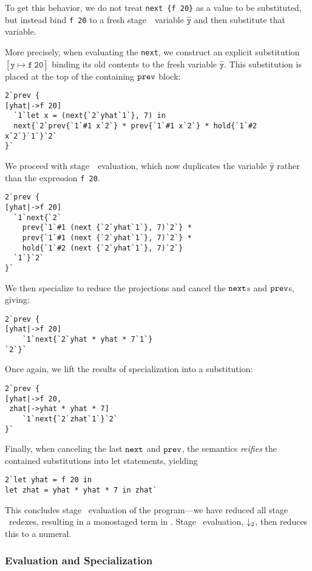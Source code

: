 To get this behavior, we do not treat \verb|next {f 20}| as a value to be substituted, 
but instead bind \verb|f 20| to a fresh stage~\bbtwo\ variable $\mathtt{\hat y}$
and then substitute that variable.

More precisely, when evaluating the \verb|next|, we construct an explicit
substitution $\mathtt{[\hat y\mapsto f~20]}$ binding its old contents to the
fresh variable $\mathtt{\hat y}$. This substitution is placed at the top of the
containing ${\tt prev}$ block:
\begin{lstlisting} 
2`prev {
[yhat|->f 20]
  `1`let x = (next{`2`yhat`1`}, 7) in
  next{`2`prev{`1`#1 x`2`} * prev{`1`#1 x`2`} * hold{`1`#2 x`2`}`1`}`2`
}`
\end{lstlisting}
We proceed with stage~\bbone\ evaluation, which now duplicates the variable
$\mathtt{\hat y}$ rather than the expression \verb|f 20|.
\begin{lstlisting} 
2`prev {
[yhat|->f 20]
  `1`next{`2`
    prev{`1`#1 (next {`2`yhat`1`}, 7)`2`} * 
    prev{`1`#1 (next {`2`yhat`1`}, 7)`2`} *
    hold{`1`#2 (next {`2`yhat`1`}, 7)`2`}
  `1`}`2`
}`
\end{lstlisting}
We then specialize to reduce the projections and cancel the ${\tt next}$s and ${\tt prev}$s, giving:
\begin{lstlisting} 
2`prev {
[yhat|->f 20]
    `1`next{`2`yhat * yhat * 7`1`}
`2`}`
\end{lstlisting}
Once again, we lift the results of specialization into a substitution:
\begin{lstlisting} 
2`prev {
[yhat|->f 20,
 zhat|->yhat * yhat * 7]
    `1`next{`2`zhat`1`}`2`
}`
\end{lstlisting}
Finally, when canceling the last ${\tt next}$ and ${\tt prev}$, the semantics {\em reifies} the contained substitutions into let statements, yielding
\begin{lstlisting} 
2`let yhat = f 20 in
let zhat = yhat * yhat * 7 in zhat`
\end{lstlisting}

This concludes stage \bbone\ evaluation of the program---we have reduced all
stage \bbone\ redexes, resulting in a monostaged term in \langTwo. Stage \bbtwo\
evaluation, ${\downarrow_{ 2}}$, then reduces this to a numeral.

\subsubsection{Evaluation and Specialization}
\label{ssec:dynamics}

